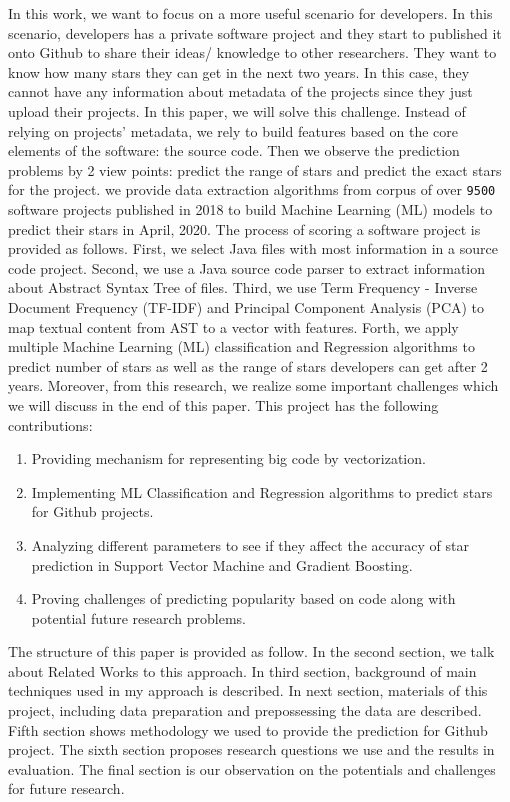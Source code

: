 In this work, we want to focus on a more useful scenario for developers. In this scenario, developers has a private software project and they start to published it onto Github to share their ideas/ knowledge to other researchers. They want to know how many stars they can get in the next two years. In this case, they cannot have any information about metadata of the projects since they just upload their projects. In this paper, we will solve this challenge. Instead of relying on projects' metadata, we rely to build features based on the core elements of the software: the source code. Then we observe the prediction problems by 2 view points: predict the range of stars and predict the exact stars for the project. we provide data extraction algorithms from corpus of over \texttt{9500} software projects published in 2018 to build Machine Learning (ML) models to predict their stars in April, 2020. 
The process of scoring a software project is provided as follows. First, we select Java files with most information in a source code project. Second, we use a Java source code parser to extract information about Abstract Syntax Tree of files. Third, we use Term Frequency - Inverse Document Frequency (TF-IDF) and Principal Component Analysis (PCA) to map textual content from AST to a vector with features. Forth, we apply multiple Machine Learning (ML) classification and Regression algorithms to predict number of stars as well as the range of stars developers can get after 2 years. Moreover, from this research, we realize some important challenges which we will discuss in the end of this paper. This project has the following contributions:
\begin{enumerate}
    \item Providing mechanism for representing big code by vectorization.
    \item Implementing ML Classification and Regression algorithms to predict stars for Github projects.
    \item Analyzing different parameters to see if they affect the accuracy of star prediction in Support Vector Machine and Gradient Boosting.
    \item Proving challenges of predicting popularity based on code along with potential future research problems. 
\end{enumerate}

The structure of this paper is provided as follow. In the second section, we talk about Related Works to this approach. In third section, background of main techniques used in my approach is described. In next section, materials of this project, including data preparation and prepossessing the data are described. Fifth section shows methodology we used to provide the prediction for Github project. The sixth section proposes research questions we use and the results in evaluation. The final section is our observation on the potentials and challenges for future research. 

